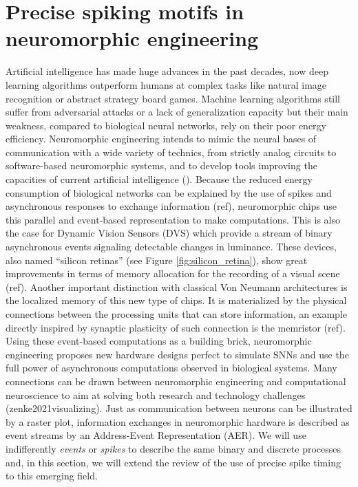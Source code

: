 \documentclass[brainsci, %
               review,submit,pdftex,moreauthors
               ]{Definitions/mdpi}
\begin{document}
\section{Precise spiking motifs in neuromorphic engineering}
\label{sec:neuromorphic}
Artificial intelligence has made huge advances in the past decades, now deep learning algorithms outperform humans at complex tasks like natural image recognition or abstract strategy board games. Machine learning algorithms still suffer from adversarial attacks or a lack of generalization capacity but their main weakness, compared to biological neural networks, rely on their poor energy efficiency. Neuromorphic engineering intends to mimic the neural bases of communication with a wide variety of technics, from strictly analog circuits to software-based neuromorphic systems, and to develop tools improving the capacities of current artificial intelligence (\cite{roy2018toward}). Because the reduced energy consumption of biological networks can be explained by the use of spikes and asynchronous responses to exchange information (ref), neuromorphic chips use this parallel and event-based representation to make computations. This is also the case for Dynamic Vision Sensors (DVS) which provide a stream of binary asynchronous events signaling detectable changes in luminance. These devices, also named ``silicon retinas'' (see Figure \ref{fig:silicon_retina}), show great improvements in terms of memory allocation for the recording of a visual scene (ref). Another important distinction with classical Von Neumann architectures is the localized memory of this new type of chips. It is materialized by the physical connections between the processing units that can store information, an example directly inspired by synaptic plasticity of such connection is the memristor (ref). Using these event-based computations as a building brick, neuromorphic engineering proposes new hardware designs perfect to simulate SNNs and use the full power of asynchronous computations observed in biological systems. Many connections can be drawn between neuromorphic engineering and computational neuroscience to aim at solving both research and technology challenges (zenke2021visualizing). Just as communication between neurons can be illustrated by a raster plot, information exchanges in neuromorphic hardware is described as event streams by an Address-Event Representation (AER). We will use indifferently \textit{events} or \textit{spikes} to describe the same binary and discrete processes and, in this section, we will extend the review of the use of precise spike timing to this emerging field. 
\end{document}
